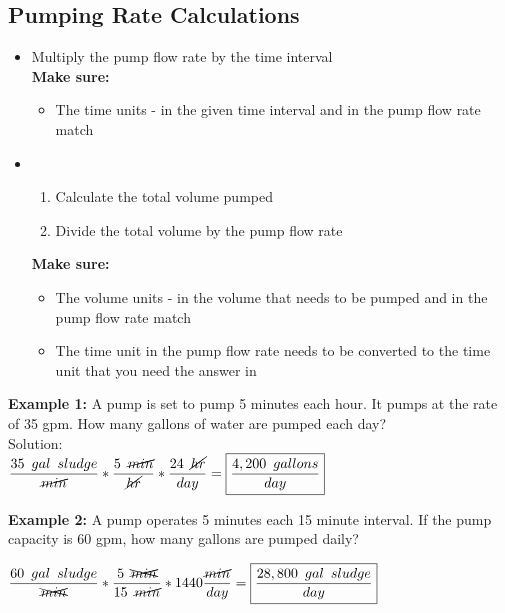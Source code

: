 \newpage
\subsection{Pumping Rate Calculations}
\begin{itemize}
\item {} Multiply the pump flow rate by the time interval\\
\textbf{Make sure:}
\begin{itemize}
\item The time units - in the given time interval and in the pump flow rate match
\end{itemize}
\item {}
\begin{enumerate}[Step 1.]
\item Calculate the total volume pumped
\item Divide the total volume by the pump flow rate
\end{enumerate}
\textbf{Make sure:}
\begin{itemize}
\item The volume units - in the volume that needs to be pumped and in the pump flow rate match
\item The time unit in the pump flow rate needs to be converted to the time unit that you need the answer in
\end{itemize}
\end{itemize}

\textbf{Example 1:}  A pump is set to pump 5 minutes each hour. It pumps at the rate of 35 gpm. How many gallons of water are pumped each day?\\
Solution:\\
$\dfrac{35 \enspace gal \enspace sludge}{\cancel{min}}*\dfrac{5 \enspace \cancel{min}}{\cancel{hr}} *\dfrac{24 \enspace \cancel{hr}}{day}=\boxed{\dfrac{4,200 \enspace gallons}{day}}$\\
\vspace{0.5cm}

\textbf{Example 2:}  A pump operates 5 minutes each 15 minute interval.  If the pump capacity is 60 gpm, how many gallons are pumped daily?

$\dfrac{60 \enspace gal \enspace sludge}{\xcancel{min}}*\dfrac{5 \enspace \xcancel{min}}{15 \enspace \cancel{min}}*1440\dfrac{\cancel{min}}{day}=\boxed{\dfrac {28,800 \enspace gal \enspace sludge }{day}}$\\
\vspace{0.5cm}

